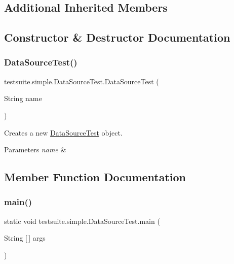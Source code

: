 \subsection*{Additional Inherited Members}


\subsection{Constructor \& Destructor Documentation}
\mbox{\label{classtestsuite_1_1simple_1_1_data_source_test_ad5806ab14f44ef48ea33738cd8bcff30}} 
\subsubsection{\texorpdfstring{Data\+Source\+Test()}{DataSourceTest()}}
{\footnotesize\ttfamily testsuite.\+simple.\+Data\+Source\+Test.\+Data\+Source\+Test (\begin{DoxyParamCaption}\item[{String}]{name }\end{DoxyParamCaption})}

Creates a new \mbox{\hyperlink{classtestsuite_1_1simple_1_1_data_source_test}{Data\+Source\+Test}} object.


\begin{DoxyParams}{Parameters}
{\em name} & \\
\hline
\end{DoxyParams}


\subsection{Member Function Documentation}
\mbox{\label{classtestsuite_1_1simple_1_1_data_source_test_a0cca4d619b5b552e16eb9332c191ce5f}} 
\subsubsection{\texorpdfstring{main()}{main()}}
{\footnotesize\ttfamily static void testsuite.\+simple.\+Data\+Source\+Test.\+main (\begin{DoxyParamCaption}\item[{String \mbox{[}$\,$\mbox{]}}]{args }\end{DoxyParamCaption})\hspace{0.3cm}{\ttfamily [static]}}

